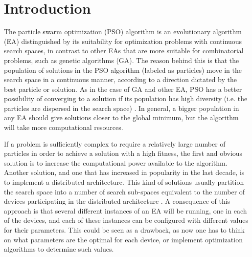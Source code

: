 

\section{Introduction}
\label{introduction}

The particle swarm optimization (PSO) algorithm is an evolutionary algorithm (EA) distinguished by its suitability for optimization problems with continuous search spaces, in contrast to other EAs that are more suitable for combinatorial problems, such as genetic algorithms (GA). The reason behind this is that the population of solutions in the PSO algorithm (labeled as particles) move in the search space in a continuous manner, according to a direction dictated by the best particle or solution. As in the case of GA and other EA, PSO has a better possibility of converging to a solution if its population has high diversity (i.e. the particles are dispersed in the search space) \cite{morrison2001measurement}. In general, a bigger population in any EA should give solutions closer to the global minimum, but the algorithm will take more computational resources.

If a problem is sufficiently complex to require a relatively large number of particles in order to achieve a solution with a high fitness, the first and obvious solution is to increase the computational power available to the algorithm. Another solution, and one that has increased in popularity in the last decade, is to implement a distributed architecture. This kind of solutions usually partition the search space into a number of search sub-spaces equivalent to the number of devices participating in the distributed architecture \cite{sahin2007distributed}. A consequence of this approach is that several different instances of an EA will be running, one in each of the devices, and each of these instances can be configured with different values for their parameters. This could be seen as a drawback, as now one has to think on what parameters are the optimal for each device, or implement optimization algorithms to determine such values.

